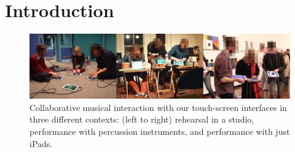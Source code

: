 \documentclass{sigchi}
\begin{document}



\section{Introduction}

\begin{figure}
  \centering
  \includegraphics[width=\linewidth]{figures/three-performance-contexts}
  \caption{Collaborative musical interaction with our touch-screen
    interfaces in three different contexts: (left to right) rehearsal
    in a studio,
    performance with percussion instruments, and performance with just
    iPads.\label{fig:three-performance-contexts}}
\end{figure}
\end{document}

